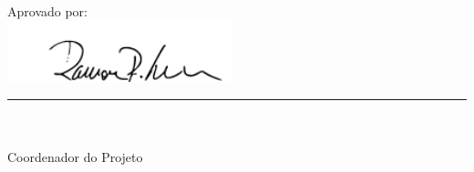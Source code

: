 \vspace{5mm}%
\parbox[t]{70mm}{
  Aprovado por: \\[5mm]
  \centering
  \includegraphics[width=65mm]{figs/logo/assinatura-ramon.png} \\[-4mm]
  \rule[2mm]{70mm}{0.1mm} \\
  \ramon \\[1mm]
  Coordenador do Projeto \\
}

\fim